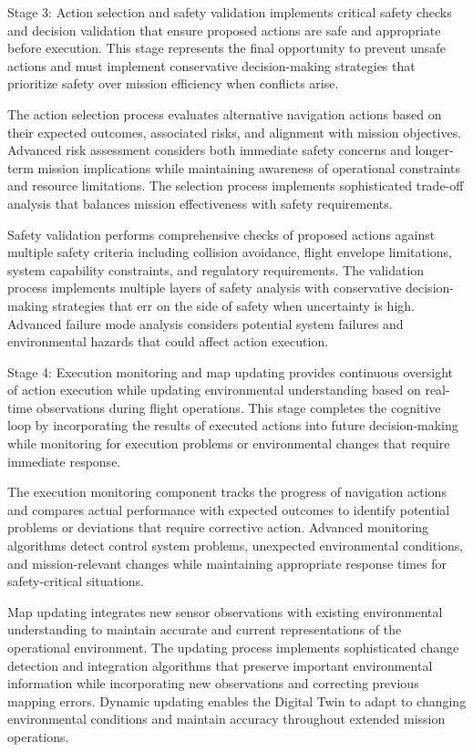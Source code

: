 Stage 3: Action selection and safety validation implements critical safety checks and decision validation that ensure proposed actions are safe and appropriate before execution. This stage represents the final opportunity to prevent unsafe actions and must implement conservative decision-making strategies that prioritize safety over mission efficiency when conflicts arise.

The action selection process evaluates alternative navigation actions based on their expected outcomes, associated risks, and alignment with mission objectives. Advanced risk assessment considers both immediate safety concerns and longer-term mission implications while maintaining awareness of operational constraints and resource limitations. The selection process implements sophisticated trade-off analysis that balances mission effectiveness with safety requirements.

Safety validation performs comprehensive checks of proposed actions against multiple safety criteria including collision avoidance, flight envelope limitations, system capability constraints, and regulatory requirements. The validation process implements multiple layers of safety analysis with conservative decision-making strategies that err on the side of safety when uncertainty is high. Advanced failure mode analysis considers potential system failures and environmental hazards that could affect action execution.

Stage 4: Execution monitoring and map updating provides continuous oversight of action execution while updating environmental understanding based on real-time observations during flight operations. This stage completes the cognitive loop by incorporating the results of executed actions into future decision-making while monitoring for execution problems or environmental changes that require immediate response.

The execution monitoring component tracks the progress of navigation actions and compares actual performance with expected outcomes to identify potential problems or deviations that require corrective action. Advanced monitoring algorithms detect control system problems, unexpected environmental conditions, and mission-relevant changes while maintaining appropriate response times for safety-critical situations.

Map updating integrates new sensor observations with existing environmental understanding to maintain accurate and current representations of the operational environment. The updating process implements sophisticated change detection and integration algorithms that preserve important environmental information while incorporating new observations and correcting previous mapping errors. Dynamic updating enables the Digital Twin to adapt to changing environmental conditions and maintain accuracy throughout extended mission operations.

